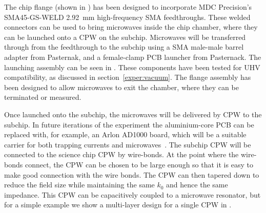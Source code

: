 
The chip flange (shown in ) has been
designed to incorporate MDC Precision's SMA45-GS-WELD \SI{2.92}{\milli\meter}
high-frequency SMA feedthroughs. These welded connectors can be used to bring
microwaves inside the chip chamber, where they can be launched onto a CPW on
the subchip. Microwaves will be transferred through from the feedthrough to the
subchip using a SMA male-male barrel adapter from Pasternak, and a female-clamp
PCB launcher from Pasternack. The launching assembly can be seen in
. These components have been tested for UHV
compatibility, as discussed in section~\ref{exper:vacuum}.  The flange
assembly has been designed to allow microwaves to exit the chamber, where they
can be terminated or measured.

Once launched onto the subchip, the microwaves will be delivered by CPW to the
subchip. 
%
In future iterations of the experiment the aluminium-core PCB can be replaced
with, for example, an Arlon AD1000 board, which will be a suitable carrier for
both trapping currents and microwaves~\cite{Morgan2020}. 
%
The subchip CPW will be connected to the science chip CPW by wire-bonds.  At
the point where the wire-bonds connect, the CPW can be chosen to be 
large enough so that it is easy to make good connection with the wire bonds. The CPW
can then tapered down to reduce the field size while maintaining the same $k_0$
and hence the same impedance. This CPW can be capacitively coupled to a
microwave resonator, but for a simple example we show a multi-layer design for
a single CPW in .

